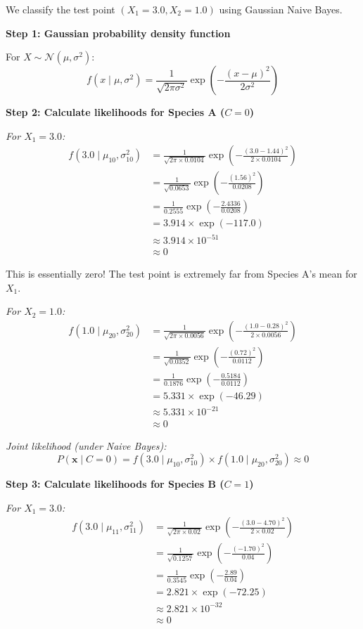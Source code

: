 \documentclass[12pt]{article}
\begin{document}
\begin{solution}
We classify the test point $(X_1 = 3.0, X_2 = 1.0)$ using Gaussian Naive Bayes.

\textbf{Step 1: Gaussian probability density function}

For $X \sim \mathcal{N}(\mu, \sigma^2)$:
\[
f(x \mid \mu, \sigma^2) = \frac{1}{\sqrt{2\pi\sigma^2}} \exp\left(-\frac{(x-\mu)^2}{2\sigma^2}\right)
\]

\textbf{Step 2: Calculate likelihoods for Species A ($C = 0$)}

\textit{For $X_1 = 3.0$:}
\begin{align}
f(3.0 \mid \mu_{10}, \sigma_{10}^2) &= \frac{1}{\sqrt{2\pi \times 0.0104}} \exp\left(-\frac{(3.0-1.44)^2}{2 \times 0.0104}\right) \\
&= \frac{1}{\sqrt{0.0653}} \exp\left(-\frac{(1.56)^2}{0.0208}\right) \\
&= \frac{1}{0.2555} \exp\left(-\frac{2.4336}{0.0208}\right) \\
&= 3.914 \times \exp(-117.0) \\
&\approx 3.914 \times 10^{-51} \\
&\approx 0
\end{align}

This is essentially zero! The test point is extremely far from Species A's mean for $X_1$.

\textit{For $X_2 = 1.0$:}
\begin{align}
f(1.0 \mid \mu_{20}, \sigma_{20}^2) &= \frac{1}{\sqrt{2\pi \times 0.0056}} \exp\left(-\frac{(1.0-0.28)^2}{2 \times 0.0056}\right) \\
&= \frac{1}{\sqrt{0.0352}} \exp\left(-\frac{(0.72)^2}{0.0112}\right) \\
&= \frac{1}{0.1876} \exp\left(-\frac{0.5184}{0.0112}\right) \\
&= 5.331 \times \exp(-46.29) \\
&\approx 5.331 \times 10^{-21} \\
&\approx 0
\end{align}

\textit{Joint likelihood (under Naive Bayes):}
\[
P(\mathbf{x} \mid C=0) = f(3.0 \mid \mu_{10}, \sigma_{10}^2) \times f(1.0 \mid \mu_{20}, \sigma_{20}^2) \approx 0
\]

\textbf{Step 3: Calculate likelihoods for Species B ($C = 1$)}

\textit{For $X_1 = 3.0$:}
\begin{align}
f(3.0 \mid \mu_{11}, \sigma_{11}^2) &= \frac{1}{\sqrt{2\pi \times 0.02}} \exp\left(-\frac{(3.0-4.70)^2}{2 \times 0.02}\right) \\
&= \frac{1}{\sqrt{0.1257}} \exp\left(-\frac{(-1.70)^2}{0.04}\right) \\
&= \frac{1}{0.3545} \exp\left(-\frac{2.89}{0.04}\right) \\
&= 2.821 \times \exp(-72.25) \\
&\approx 2.821 \times 10^{-32} \\
&\approx 0
\end{align}


\end{solution}
\end{document}
